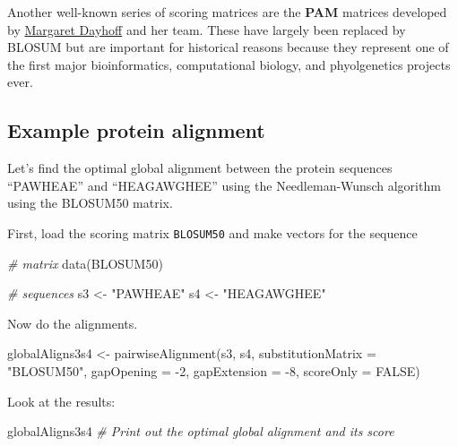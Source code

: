 \documentclass[
]{book}
\newenvironment{Shaded}{\begin{snugshade}}{\end{snugshade}}
\newcommand{\AttributeTok}[1]{\textcolor[rgb]{0.77,0.63,0.00}{#1}}
\newcommand{\CommentTok}[1]{\textcolor[rgb]{0.56,0.35,0.01}{\textit{#1}}}
\newcommand{\ConstantTok}[1]{\textcolor[rgb]{0.00,0.00,0.00}{#1}}
\newcommand{\DecValTok}[1]{\textcolor[rgb]{0.00,0.00,0.81}{#1}}
\newcommand{\FunctionTok}[1]{\textcolor[rgb]{0.00,0.00,0.00}{#1}}
\newcommand{\NormalTok}[1]{#1}
\newcommand{\OtherTok}[1]{\textcolor[rgb]{0.56,0.35,0.01}{#1}}
\newcommand{\SpecialCharTok}[1]{\textcolor[rgb]{0.00,0.00,0.00}{#1}}
\newcommand{\StringTok}[1]{\textcolor[rgb]{0.31,0.60,0.02}{#1}}
\begin{document}
Another well-known series of scoring matrices are the \textbf{PAM} matrices developed by \href{https://en.wikipedia.org/wiki/Margaret_Oakley_Dayhoff}{Margaret Dayhoff} and her team. These have largely been replaced by BLOSUM but are important for historical reasons because they represent one of the first major bioinformatics, computational biology, and phyolgenetics projects ever.

\hypertarget{example-protein-alignment}{%
\subsection{Example protein alignment}\label{example-protein-alignment}}

Let's find the optimal global alignment between the protein sequences ``PAWHEAE'' and ``HEAGAWGHEE'' using the Needleman-Wunsch algorithm using the BLOSUM50 matrix.

First, load the scoring matrix \texttt{BLOSUM50} and make vectors for the sequence

\begin{Shaded}
\begin{Highlighting}[]
\CommentTok{\# matrix}
\FunctionTok{data}\NormalTok{(BLOSUM50)}

\CommentTok{\# sequences}
\NormalTok{s3 }\OtherTok{\textless{}{-}} \StringTok{"PAWHEAE"}
\NormalTok{s4 }\OtherTok{\textless{}{-}} \StringTok{"HEAGAWGHEE"}
\end{Highlighting}
\end{Shaded}

Now do the alignments.

\begin{Shaded}
\begin{Highlighting}[]
\NormalTok{globalAligns3s4 }\OtherTok{\textless{}{-}} \FunctionTok{pairwiseAlignment}\NormalTok{(s3, s4,}
                                     \AttributeTok{substitutionMatrix =} \StringTok{"BLOSUM50"}\NormalTok{, }
                                     \AttributeTok{gapOpening =} \SpecialCharTok{{-}}\DecValTok{2}\NormalTok{,}
                                     \AttributeTok{gapExtension =} \SpecialCharTok{{-}}\DecValTok{8}\NormalTok{, }
                                     \AttributeTok{scoreOnly =} \ConstantTok{FALSE}\NormalTok{)}
\end{Highlighting}
\end{Shaded}

Look at the results:

\begin{Shaded}
\begin{Highlighting}[]
\NormalTok{globalAligns3s4 }\CommentTok{\# Print out the optimal global alignment and its score}
\end{Highlighting}
\end{Shaded}
\end{document}
